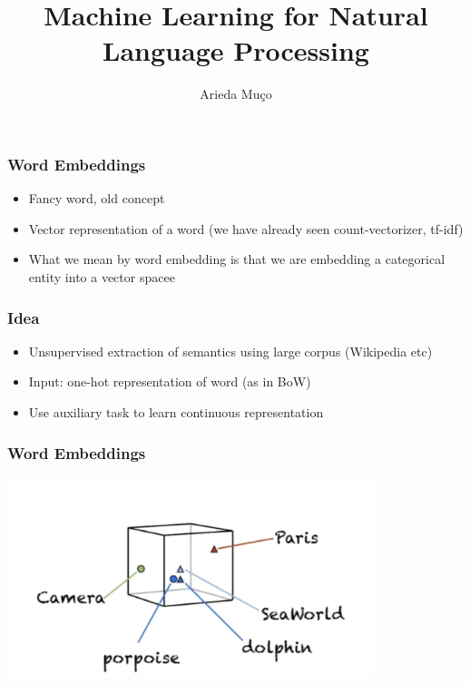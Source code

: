 \documentclass[compress, aspectratio=54]{beamer}
\title[Word Embeddings]{Machine Learning for Natural Language Processing}
\author[Arieda Mu\c co]{Arieda Mu\c co}
\institute[CEU]{Central European University}
\date{}
\begin{document}
\captionsetup[subfigure]{labelformat=empty}

\frame{\titlepage}



\begin{frame}
\frametitle{Word Embeddings}
\begin{itemize}
\item Fancy word, old concept
\item Vector representation of a word (we have already seen count-vectorizer, tf-idf) 
\item What we mean by word embedding is that we are embedding a categorical entity into a vector spacee
\end{itemize}
\end{frame}
\begin{frame}
\frametitle{Idea}
\begin{itemize}
\item Unsupervised extraction of semantics using large corpus (Wikipedia etc)
\item Input: one-hot representation of word (as in BoW)
\item Use auxiliary task to learn continuous representation
\end{itemize}
\end{frame}




\begin{frame}
\frametitle{Word Embeddings}
\begin{center}
    \includegraphics[width=0.8\textwidth]{Figures/word-embeddings}
\end{center}
\end{frame}
\end{document}
